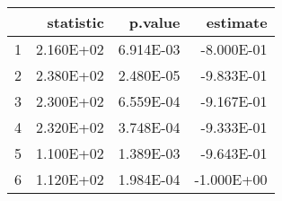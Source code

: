 \begin{table}[ht]
\centering
\begin{tabular}{rrrr}
  \hline
 & statistic & p.value & estimate \\ 
  \hline
1 & 2.160E+02 & 6.914E-03 & -8.000E-01 \\ 
  2 & 2.380E+02 & 2.480E-05 & -9.833E-01 \\ 
  3 & 2.300E+02 & 6.559E-04 & -9.167E-01 \\ 
  4 & 2.320E+02 & 3.748E-04 & -9.333E-01 \\ 
  5 & 1.100E+02 & 1.389E-03 & -9.643E-01 \\ 
  6 & 1.120E+02 & 1.984E-04 & -1.000E+00 \\ 
   \hline
\end{tabular}
\end{table}
